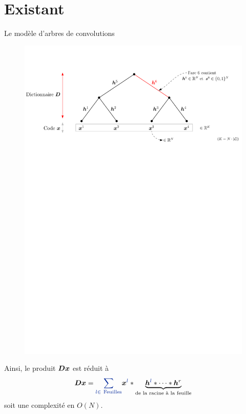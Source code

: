 \section{Existant}






\begin{frame}{Le modèle d'arbres de convolutions}
\begin{figure}
	\includegraphics[width=\textwidth]{figures/tree.pdf}
\end{figure}
Ainsi, le produit $\bm{D}\bm{x}$ est réduit à
\begin{equation} 
\D \x = \Beq{\sum_{l \in ~\text{Feuilles}}} \x^{\Beq{l}} * \underbrace{\h^{\Beq{l}}* \dots* \h^{r}}_{\textrm{de la racine à la feuille}}
\end{equation}
soit une complexité en $O(N)$.
\end{frame}
 

